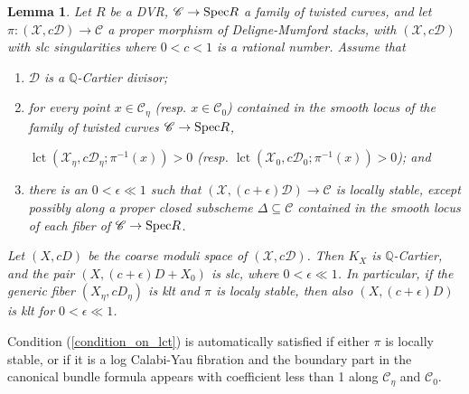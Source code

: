 \documentclass[a4paper,12pt]{amsart}
\newcommand{\bQ}{{\mathbb Q}}
\newcommand{\sD}{{\mathscr{D}}}
\newcommand{\sX}{{\mathscr{X}}}
\newcommand{\sC}{{\mathscr{C}}}
\newcommand\spec{\text{\rm Spec}}
\newtheorem{lemma}[theorem]{Lemma}
\theoremstyle{definition}
\theoremstyle{remark}
\begin{document}
\begin{lemma}\label{lemma_qmap_limit_plus_divisor_has_lc_sing}
    Let $R$ be a DVR, $\sC\to \spec R $ a family of twisted curves, and let $\pi\colon (\sX,c\sD)\to \sC$ a proper morphism of Deligne-Mumford stacks, with $(\sX,c\sD)$ with slc singularities where $0<c<1$ is a rational number. Assume that
\begin{enumerate}
    \item $\sD$ is a $\bQ$-Cartier divisor;
    \item\label{condition_on_lct} for every point $x\in \sC_\eta$ (resp. $x\in \sC_0$) contained in the smooth locus of the family of twisted curves $\sC\to \spec R$, \begin{center}$\operatorname{lct}(\sX_\eta,c\sD_\eta;\pi^{-1}(x))>0$ (resp. $\operatorname{lct}(\sX_0,c\sD_0;\pi^{-1}(x))>0$); and\end{center}
    \item there is an $0<\epsilon\ll 1$ such that $(\sX,(c+\epsilon)\sD)\to \sC$ is locally stable, except possibly along a proper closed subscheme $\Delta\subseteq \sC$ contained in the smooth locus of each fiber of $\sC\to\spec R $. 
\end{enumerate}
    Let $(X,c{D})$ be the coarse moduli space of $(\sX,c\sD)$. Then $K_X$ is $\bQ$-Cartier, and the pair $(X,(c+\epsilon){D}+ X_0)$ is slc, where $0<\epsilon\ll 1$. In particular, if the generic fiber $(X_\eta,cD_\eta )$ is klt and $\pi$ is localy stable, then also $(X,(c+\epsilon){D})$ is klt for $0<\epsilon \ll 1$. 
\end{lemma}
Condition (\ref{condition_on_lct}) is automatically satisfied if either $\pi$ is locally stable, or if it is a log Calabi-Yau fibration and the boundary part in the canonical bundle formula appears with coefficient less than 1 along $\sC_\eta$ and $\sC_0$.
\end{document}
